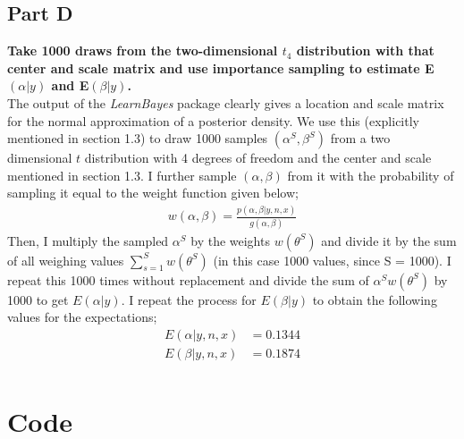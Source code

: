 \documentclass{article}
\begin{document}
\subsection{Part D}
\textbf{Take 1000 draws from the two-dimensional $t_4$ distribution with that center and scale matrix and use importance sampling to estimate E$(\alpha|y)$ and E$(\beta|y)$.}\\
The output of the \textit{LearnBayes} package clearly gives a location and scale matrix for the normal approximation of a posterior density. We use this (explicitly mentioned in section 1.3) to draw 1000 samples $(\alpha^S, \beta^S)$ from a two dimensional $t$ distribution with 4 degrees of freedom and the center and scale mentioned in section 1.3. I further sample $(\alpha,\beta)$ from it with the probability of sampling it equal to the weight function given below;
\begin{align*}
w(\alpha, \beta) = \frac{p(\alpha, \beta | y,n,x)}{g(\alpha, \beta)}
\end{align*}
Then, I multiply the sampled $\alpha^S$ by the weights $w(\theta^S)$ and divide it by the
sum of all weighing values  $\sum_{s=1}^{S} w(\theta^S)$ (in this case 1000 values, since S = 1000). I repeat this 1000 times without replacement and divide the sum of $\alpha^S w(\theta^{S})$ by 1000 to get $E(\alpha | y)$. I repeat the process for $E(\beta | y)$ to obtain the following values for the expectations;
\begin{align*}
\displaystyle
E(\alpha | y,n,x) &=   0.1344\\
E(\beta | y,n,x) &=   0.1874\\
\end{align*}

\section{Code}
\end{document}
